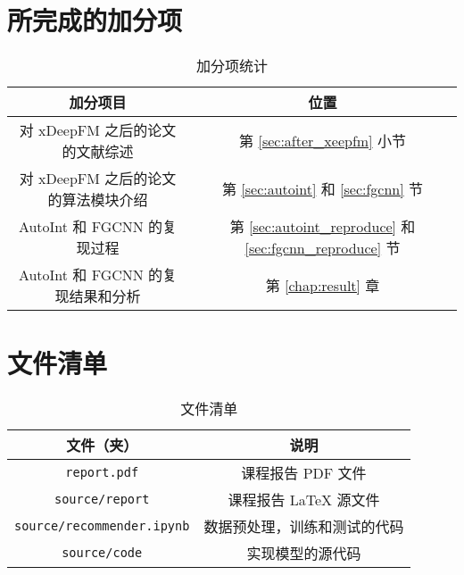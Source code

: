 \documentclass[degree=master,cjk-font=noto]{thuthesis}
\begin{document}
\chapter{所完成的加分项}

\begin{table}[htb]
  \centering
  \caption{加分项统计}
  \label{tab:time_complex}
  \begin{tabular}{cc}
    \toprule
    \textbf{加分项目}         & \textbf{位置}  \\
    \midrule
    对 xDeepFM 之后的论文的文献综述 & 第 \ref{sec:after_xeepfm} 小节 \\
    对 xDeepFM 之后的论文的算法模块介绍           & 第 \ref{sec:autoint} 和 \ref{sec:fgcnn} 节 \\
    AutoInt 和 FGCNN 的复现过程        & 第 \ref{sec:autoint_reproduce} 和 \ref{sec:fgcnn_reproduce} 节 \\
    AutoInt 和 FGCNN 的复现结果和分析 & 第 \ref{chap:result} 章 \\
    \bottomrule
  \end{tabular}
\end{table}

\backmatter


\appendix

\chapter{文件清单}

\begin{table}[htb]
  \centering
  \caption{文件清单}
  \label{tab:files}
  \begin{tabular}{cc}
    \toprule
    \textbf{文件（夹）}         & \textbf{说明}  \\
    \midrule
    \texttt{report.pdf} & 课程报告 PDF 文件 \\
    \texttt{source/report}           & 课程报告 LaTeX 源文件 \\
    \texttt{source/recommender.ipynb}        & 数据预处理，训练和测试的代码 \\
    \texttt{source/code} & 实现模型的源代码 \\
    \bottomrule
  \end{tabular}
\end{table}
\end{document}
